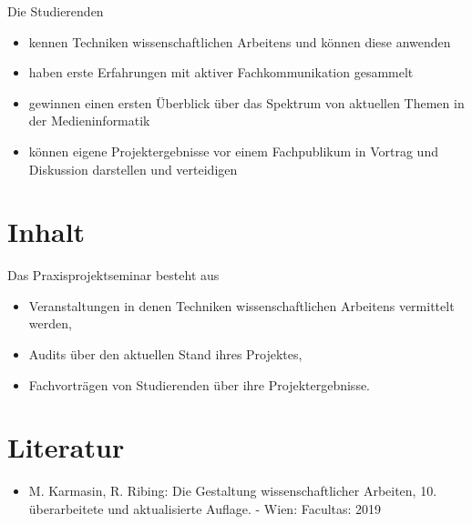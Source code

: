 Die Studierenden

\begin{itemize}
\tightlist
\item
  kennen Techniken wissenschaftlichen Arbeitens und können diese
  anwenden
\item
  haben erste Erfahrungen mit aktiver Fachkommunikation gesammelt
\item
  gewinnen einen ersten Überblick über das Spektrum von aktuellen Themen
  in der Medieninformatik
\item
  können eigene Projektergebnisse vor einem Fachpublikum in Vortrag und
  Diskussion darstellen und verteidigen
\end{itemize}

\hypertarget{inhaltpathlabelmi-2017modulbeschreibungen-bachelorba_praxisprojektseminar}{%
\section*{Inhalt\label{/mi-2017/modulbeschreibungen-bachelor/BA_Praxisprojektseminar}}\label{inhaltpathlabelmi-2017modulbeschreibungen-bachelorba_praxisprojektseminar}}

Das Praxisprojektseminar besteht aus

\begin{itemize}
\tightlist
\item
  Veranstaltungen in denen Techniken wissenschaftlichen Arbeitens
  vermittelt werden,
\item
  Audits über den aktuellen Stand ihres Projektes,
\item
  Fachvorträgen von Studierenden über ihre Projektergebnisse.
\end{itemize}

\hypertarget{literaturpathlabelmi-2017modulbeschreibungen-bachelorba_praxisprojektseminar}{%
\section*{Literatur\label{/mi-2017/modulbeschreibungen-bachelor/BA_Praxisprojektseminar}}\label{literaturpathlabelmi-2017modulbeschreibungen-bachelorba_praxisprojektseminar}}

\begin{itemize}
\tightlist
\item
  M. Karmasin, R. Ribing: Die Gestaltung wissenschaftlicher Arbeiten,
  10. überarbeitete und aktualisierte Auflage. - Wien: Facultas: 2019
\end{itemize}

